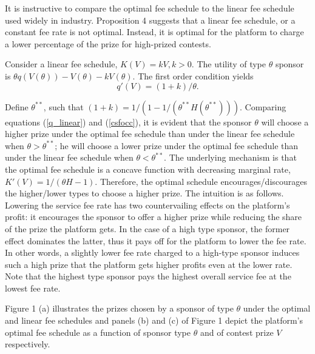 \documentclass[12pt]{article}
\begin{document}
It is instructive to compare the optimal fee schedule to the linear
fee schedule used widely in industry. Proposition 4 suggests that a linear fee schedule, or a constant fee
rate is not optimal. Instead, it is optimal for the platform to
charge a lower percentage of the prize for high-prized contests.

Consider a linear fee schedule, $K(V)=kV,k>0$.
The utility of type $\theta$ sponsor is $\theta q(V(\theta))-V(\theta)-kV(\theta)$.
The first order condition yields
\begin{equation}
q'(V)=(1+k)/\theta.\label{q_linear}
\end{equation}

Define $\theta^{**}$, such that $(1+k)=1/(1-1/(\theta^{**}H(\theta^{**})))$.
Comparing equations (\ref{q_linear}) and (\ref{csfocc}), it is evident
that the sponsor $\theta$ will choose a higher prize under the optimal
fee schedule than under the linear fee schedule when $\theta>\theta^{**}$;
he will choose a lower prize under the optimal fee schedule than under
the linear fee schedule when $\theta<\theta^{**}$. The underlying
mechanism is that the optimal fee schedule is a concave function with
decreasing marginal rate, $K'(V)=1/(\theta H-1)$. Therefore, the
optimal schedule encourages/discourages the higher/lower types to
choose a higher prize. The
intuition is as follows. Lowering the service fee rate has two countervailing
effects on the platform's profit: it encourages the sponsor to
offer a higher prize while reducing the share of the prize the platform
gets. In the case of a high type sponsor, the former effect dominates
the latter, thus it pays off for the platform to lower the fee
rate. In other words, a slightly lower fee rate charged to a high-type
sponsor induces such a high prize that the platform gets higher
profits even at the lower rate. Note that the highest type sponsor
pays the highest overall service fee at the lowest fee rate.

Figure 1 (a) illustrates the prizes chosen by a sponsor of type $\theta$
under the optimal and linear fee schedules and panels (b) and (c) of Figure 1 depict the platform's optimal fee schedule as a function of sponsor type $\theta$ and of contest prize $V$ respectively.
\end{document}
